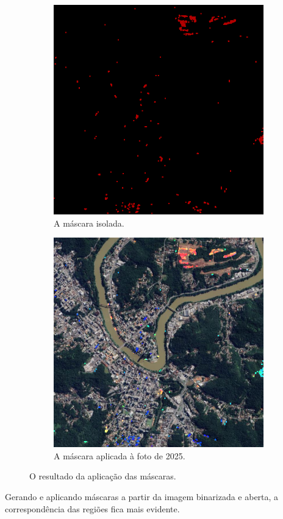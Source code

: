 \documentclass{article}
\begin{document}
\begin{figure}[H]
    \centering
    \begin{subfigure}[b]{0.48\textwidth}
        \includegraphics[width=\textwidth]{../Imagens/resultado01_mask.png}
        \caption{A máscara isolada.}
        \label{2025}
    \end{subfigure}
    \hfill %
    \begin{subfigure}[b]{0.48\textwidth}
        \includegraphics[width=\textwidth]{../Imagens/012025_mask.png}
        \caption{A máscara aplicada à foto de 2025.}
        \label{2025}
    \end{subfigure}
    \caption{O resultado da aplicação das máscaras.}
    \label{máscara}
\end{figure}

Gerando e aplicando máscaras a partir da imagem binarizada e aberta, a correspondência das regiões fica mais evidente.

\nocite{*}


\end{document}
